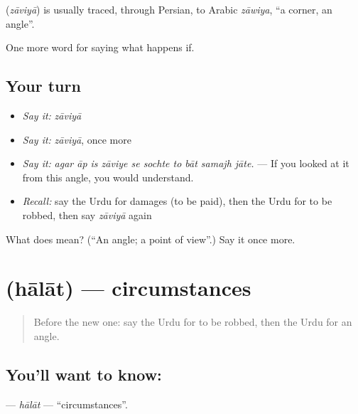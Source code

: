 \begin{cousinweb}
\textbf{} (\emph{zāviyā}) is usually traced, through Persian, to Arabic \emph{zāwiya}, \textquotedblleft{}a corner, an angle\textquotedblright{}.
\end{cousinweb}

\begin{grammarlens}[title={What you've built}]
One more word for saying what happens if.
\end{grammarlens}

\subsection*{Your turn}
\begin{itemize}
\raggedright
  \item \emph{Say it:} \emph{zāviyā}
  \item \emph{Say it:} \emph{zāviyā}, once more
  \item \emph{Say it:} \emph{agar āp is zāviye se sochte to bāt samajh jāte.} — If you looked at it from this angle, you would understand.
  \item \emph{Recall:} say the Urdu for damages (to be paid), then the Urdu for to be robbed, then say \emph{zāviyā} again
\end{itemize}

\begin{tcolorbox}[breakable,colback=teal!4,colframe=teal!35!black,title={Before you move on}]
What does  mean? (\textquotedblleft{}An angle; a point of view\textquotedblright{}.) Say it once more.
\end{tcolorbox}
\section[\texorpdfstring{\ur{حالات} (hālāt)}{حالات (hālāt)}]{ (hālāt) — circumstances}

\label{lesson:UR-C541-halat}



\begin{quote}
Before the new one: say the Urdu for to be robbed, then the Urdu for an angle.
\end{quote}

\subsection*{You'll want to know: }
\textbf{} — \emph{hālāt} — \textquotedblleft{}circumstances\textquotedblright{}.

